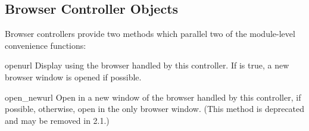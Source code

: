 \subsection{Browser Controller Objects \label{browser-controllers}}

Browser controllers provide two methods which parallel two of the
module-level convenience functions:

\begin{funcdesc}{open}{url}
  Display  using the browser handled by this controller.  If
   is true, a new browser window is opened if possible.
\end{funcdesc}

\begin{funcdesc}{open_new}{url}
  Open  in a new window of the browser handled by this
  controller, if possible, otherwise, open  in the only
  browser window.  (This method is deprecated and may be removed in
  2.1.)
\end{funcdesc}
